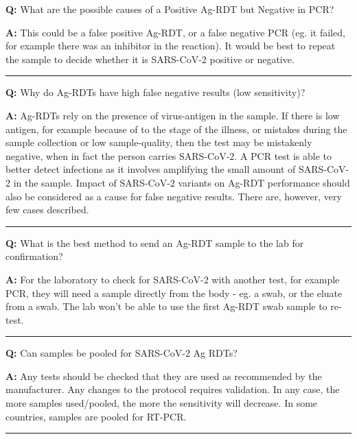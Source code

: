 \documentclass[
]{book}
\begin{document}
\textbf{Q:} What are the possible causes of a Positive Ag-RDT but Negative in PCR?

\textbf{A:} This could be a false positive Ag-RDT, or a false negative PCR (eg. it failed, for example there was an inhibitor in the reaction). It would be best to repeat the sample to decide whether it is SARS-CoV-2 positive or negative.

\begin{center}\rule{0.5\linewidth}{0.5pt}\end{center}

\textbf{Q:} Why do Ag-RDTs have high false negative results (low sensitivity)?

\textbf{A:} Ag-RDTs rely on the presence of virus-antigen in the sample. If there is low antigen, for example because of to the stage of the illness, or mistakes during the sample collection or low sample-quality, then the test may be mistakenly negative, when in fact the person carries SARS-CoV-2. A PCR test is able to better detect infections as it involves amplifying the small amount of SARS-CoV-2 in the sample. Impact of SARS-CoV-2 variants on Ag-RDT performance should also be considered as a cause for false negative results. There are, however, very few cases described.

\begin{center}\rule{0.5\linewidth}{0.5pt}\end{center}

\textbf{Q:} What is the best method to send an Ag-RDT sample to the lab for confirmation?

\textbf{A:} For the laboratory to check for SARS-CoV-2 with another test, for example PCR, they will need a sample directly from the body - eg. a swab, or the eluate from a swab. The lab won't be able to use the first Ag-RDT swab sample to re-test.

\begin{center}\rule{0.5\linewidth}{0.5pt}\end{center}

\textbf{Q:} Can samples be pooled for SARS-CoV-2 Ag RDTs?

\textbf{A:} Any tests should be checked that they are used as recommended by the manufacturer. Any changes to the protocol requires validation. In any case, the more samples used/pooled, the more the sensitivity will decrease. In some countries, samples are pooled for RT-PCR.

\begin{center}\rule{0.5\linewidth}{0.5pt}\end{center}
\end{document}

